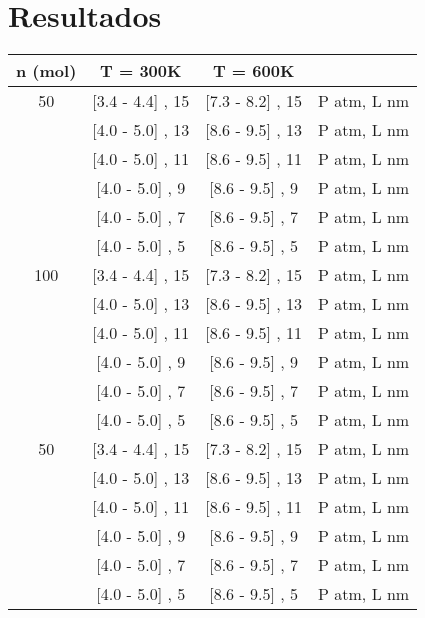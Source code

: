 \documentclass[]{article}
\begin{document}
\section{Resultados}

 




\begin{table}
 \centering
 \begin{tabular}{|c|c|c|l|} \hline
  n (mol)&  T = 300K        &    T = 600K    &        \\ \hline
   50    & [3.4 - 4.4] , 15 & [7.3 - 8.2] , 15& P atm, L nm\\ 
         & [4.0 - 5.0] , 13 & [8.6 - 9.5] , 13& P atm, L nm\\
         & [4.0 - 5.0] , 11 & [8.6 - 9.5] , 11& P atm, L nm\\ 
         & [4.0 - 5.0] ,  9 & [8.6 - 9.5] ,  9& P atm, L nm\\ 
         & [4.0 - 5.0] ,  7 & [8.6 - 9.5] ,  7& P atm, L nm\\  
         & [4.0 - 5.0] ,  5 & [8.6 - 9.5] ,  5& P atm, L nm\\ \hline
   100   & [3.4 - 4.4] , 15 & [7.3 - 8.2] , 15& P atm, L nm\\ 
         & [4.0 - 5.0] , 13 & [8.6 - 9.5] , 13& P atm, L nm\\
         & [4.0 - 5.0] , 11 & [8.6 - 9.5] , 11& P atm, L nm\\ 
         & [4.0 - 5.0] ,  9 & [8.6 - 9.5] ,  9& P atm, L nm\\ 
         & [4.0 - 5.0] ,  7 & [8.6 - 9.5] ,  7& P atm, L nm\\  
         & [4.0 - 5.0] ,  5 & [8.6 - 9.5] ,  5& P atm, L nm\\ \hline
    50   & [3.4 - 4.4] , 15 & [7.3 - 8.2] , 15& P atm, L nm\\ 
         & [4.0 - 5.0] , 13 & [8.6 - 9.5] , 13& P atm, L nm\\
         & [4.0 - 5.0] , 11 & [8.6 - 9.5] , 11& P atm, L nm\\ 
         & [4.0 - 5.0] ,  9 & [8.6 - 9.5] ,  9& P atm, L nm\\ 
         & [4.0 - 5.0] ,  7 & [8.6 - 9.5] ,  7& P atm, L nm\\  
         & [4.0 - 5.0] ,  5 & [8.6 - 9.5] ,  5& P atm, L nm\\ \hline

   



 \end{tabular}
 \end{table}
\end{document}
